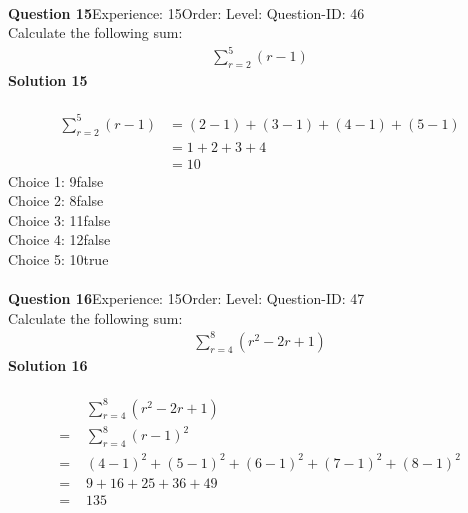 \documentclass{article}
\begin{document}
\\[4pt]
\noindent\textbf{Question 15}\hspace{20pt}Experience: 15\hspace{20pt}Order: \hspace{20pt}Level: \hspace{20pt}Question-ID: 46\\[2pt]
Calculate the following sum:
\begin{align*}
\sum_{r=2}^{5} (r-1)
\end{align*}
\noindent\textbf{Solution 15}\\[2pt]
\\[-35pt]\begin{align*}
\sum_{r=2}^{5} (r-1)&=(2-1)+(3-1)+(4-1)+(5-1)\\[2pt]
&=1+2+3+4\\[2pt]
&=10
\end{align*}
Choice 1: \hspace{20pt}9\hspace{20pt}false\\
Choice 2: \hspace{20pt}8\hspace{20pt}false\\
Choice 3: \hspace{20pt}11\hspace{20pt}false\\
Choice 4: \hspace{20pt}12\hspace{20pt}false\\
Choice 5: \hspace{20pt}10\hspace{20pt}true\\
\\[4pt]
\noindent\textbf{Question 16}\hspace{20pt}Experience: 15\hspace{20pt}Order: \hspace{20pt}Level: \hspace{20pt}Question-ID: 47\\[2pt]
Calculate the following sum:
\begin{align*}
\sum_{r=4}^{8} (r^2-2r+1)
\end{align*}
\noindent\textbf{Solution 16}\\[2pt]
\\[-35pt]\begin{align*}
&\sum_{r=4}^{8} (r^2-2r+1)\\[2pt]
=\,\,&\sum_{r=4}^{8} (r-1)^2\\[2pt]
=\,\,&(4-1)^2+(5-1)^2+(6-1)^2+(7-1)^2+(8-1)^2\\[2pt]
=\,\,&9+16+25+36+49\\[2pt]
=\,\,&135
\end{align*}
\end{document}
